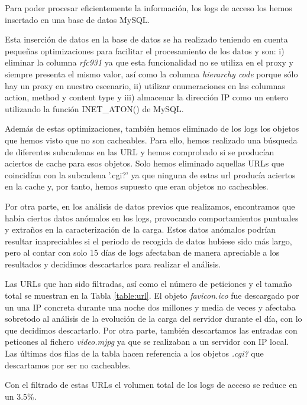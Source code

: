 \documentclass[twocolumn]{Jornadas}
\begin{document}
Para poder procesar eficientemente la información, los logs de acceso los hemos insertado en una base de datos MySQL.

Esta inserción de datos en la base de datos se ha realizado teniendo en cuenta pequeñas optimizaciones para facilitar el procesamiento de los datos y son: i) eliminar la columna \textit{rfc931} ya que esta funcionalidad no se utiliza en el proxy y siempre presenta el mismo valor, así como la columna \textit{hierarchy code} porque sólo hay un proxy en nuestro escenario, ii) utilizar  enumeraciones en las columnas action, method y content type y iii) almacenar la dirección IP como un entero utilizando la función INET\_ATON() de MySQL.

Además de estas optimizaciones, también hemos eliminado de los logs los objetos que hemos visto que no son cacheables. Para ello, hemos realizado una búsqueda de diferentes subcadenas en las URL y hemos comprobado si se producían aciertos de cache para esos objetos. Solo hemos eliminado aquellas URLs que coincidían con la subcadena '.cgi?' ya que ninguna de estas url producía aciertos en la cache y, por tanto, hemos supuesto que eran objetos no cacheables.

Por otra parte, en los análisis de datos previos que realizamos, encontramos que había ciertos datos anómalos en los logs, provocando comportamientos puntuales y extraños en la caracterización de la carga. Estos datos anómalos podrían resultar inapreciables si el periodo de recogida de datos hubiese sido más largo, pero al contar con solo 15 días de logs afectaban de manera apreciable a los resultados y decidimos descartarlos para realizar el análisis.

Las URLs que han sido filtradas, así como el número de peticiones y el tamaño total se muestran en la Tabla \ref{table:url}. El objeto \textit{favicon.ico} fue descargado por un una IP concreta durante una noche dos millones y media de veces y afectaba sobretodo al análisis de la evolución de la carga del servidor durante el día, con lo que decidimos descartarlo. Por otra parte, también descartamos las entradas con peticones al fichero \textit{video.mjpg} ya que se realizaban a un servidor con IP local. Las últimas dos filas de la tabla hacen referencia a los objetos \textit{.cgi?} que descartamos por ser no cacheables.

Con el filtrado de estas URLs el volumen total de los logs de acceso se reduce en un 3.5\%.
\end{document}
